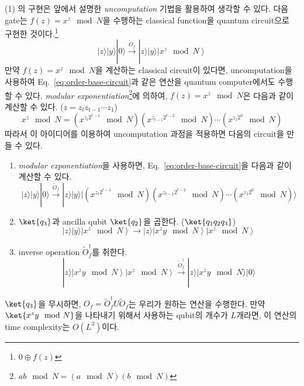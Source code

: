 (1) 의 구현은 앞에서 설명한 \textit{uncomputation} 기법을 활용하여 생각할 수 있다.
다음 gate는 $f(z) = x^z \mod N$을 수행하는 classical function을 quantum circuit으로 구현한 것이다.\footnote{$0 \oplus f(z)$}
\begin{equation}
  |z\rangle|y\rangle|0\rangle \xrightarrow{\tilde O_f} |z\rangle|y\rangle\left|x^z \mod N\right\rangle \label{eq:order-base-circuit}
\end{equation}
만약 $f(z) = x^z \mod N$을 계산하는 classical circuit이 있다면, uncomputation을 사용하여 Eq.~\eqref{eq:order-base-circuit}과 같은 연산을 quantum computer에서도 수행할 수 있다.
\textit{modular exponentiation}\footnote{$ab \mod N = (a \mod N) (b \mod N)$}에 의하여, $f(z) = x^z \mod N$은 다음과 같이 계산할 수 있다. ($z = z_tz_{t-1} \cdots z_1$)
\begin{equation*}
  x^z \mod N  =  (x^{z_t 2^{t-1}} \mod N)(x^{z_{t-1} 2^{t-2}} \mod N) \cdots (x^{z_1 2^{0}}\mod N)
\end{equation*}
따라서 이 아이디어를 이용하여 uncomputation 과정을 적용하면 다음의 circuit을 만들 수 있다.
\begin{enumerate}
  \item \textit{modular exponentiation}을 사용하면, Eq.~\eqref{eq:order-base-circuit}을 다음과 같이 계산할 수 있다.
  \begin{equation*}
    |z\rangle|y\rangle|0\rangle \xrightarrow{\tilde O_f} |z\rangle|y\rangle|(x^{z_t 2^{t-1}} \mod N)(x^{z_{t-1} 2^{t-2}} \mod N) \cdots (x^{z_1 2^{0}}\mod N)\rangle
    \end{equation*}
  \item $\ket{q_3}$과 ancilla qubit $\ket{q_2}$을 곱한다. ($\ket{q_1q_2q_3}$)
  \begin{equation*}
    |z\rangle|y\rangle\left|x^z \mod N\right\rangle \rightarrow |z\rangle\left| x^z y \mod N\right\rangle \left| x^z \mod N\right\rangle
  \end{equation*}
  \item inverse operation $\tilde O_f^\dagger$를 취한다.
  \begin{equation*}
    |z\rangle\left| x^z y \mod N\right\rangle \left| x^z \mod N\right\rangle \xrightarrow{\tilde O_f^\dagger} |z\rangle|x^zy \mod N\rangle|0\rangle
  \end{equation*}
\end{enumerate}
$\ket {q_3}$을 무시하면, $O_f = \tilde O_f^\dagger U \tilde O_f$는 우리가 원하는 연산을 수행한다. 
만약 $\ket{x^zy \mod N}$을 나타내기 위해서 사용하는 qubit의 개수가 $L$개라면, 이 연산의 time complexity는 $O(L^3)$이다.
